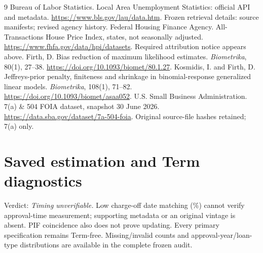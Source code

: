 \begin{thebibliography}{9}
 Bureau of Labor Statistics. Local Area Unemployment Statistics: official API and metadata. \url{https://www.bls.gov/lau/data.htm}. Frozen retrieval details: source manifests; revised agency history.
 Federal Housing Finance Agency. All-Transactions House Price Index, states, not seasonally adjusted. \url{https://www.fhfa.gov/data/hpi/datasets}. Required attribution notice appears above.
 Firth, D. Bias reduction of maximum likelihood estimates. \emph{Biometrika}, 80(1), 27--38. \url{https://doi.org/10.1093/biomet/80.1.27}.
 Kosmidis, I. and Firth, D. Jeffreys-prior penalty, finiteness and shrinkage in binomial-response generalized linear models. \emph{Biometrika}, 108(1), 71--82. \url{https://doi.org/10.1093/biomet/asaa052}.
 U.S. Small Business Administration. 7(a) \& 504 FOIA dataset, snapshot 30 June 2026. \url{https://data.sba.gov/dataset/7a-504-foia}. Original source-file hashes retained; 7(a) only.
\end{thebibliography}

\appendix
\section{Saved estimation and Term diagnostics}
Verdict: \emph{Timing unverifiable.} Low charge-off date matching (\TermMatch\%) cannot verify approval-time measurement; supporting metadata or an original vintage is absent. PIF coincidence also does not prove updating. Every primary specification remains Term-free. Missing/invalid counts and approval-year/loan-type distributions are available in the complete frozen audit.

